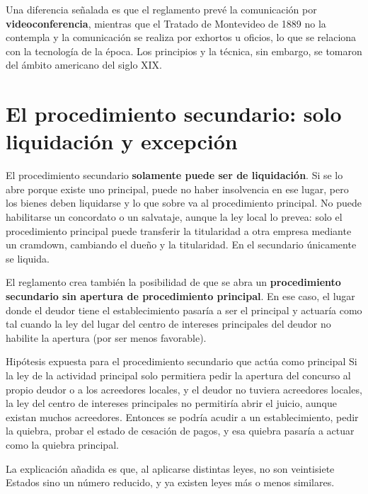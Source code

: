 \documentclass[12pt,oneside]{book}
\begin{document}
Una diferencia señalada es que el reglamento prevé la comunicación por \textbf{videoconferencia}, mientras que el Tratado de Montevideo de 1889 no la contempla y la comunicación se realiza por exhortos u oficios, lo que se relaciona con la tecnología de la época. Los principios y la técnica, sin embargo, se tomaron del ámbito americano del siglo XIX.

\section{El procedimiento secundario: solo liquidación y excepción}

El procedimiento secundario \textbf{solamente puede ser de liquidación}. Si se lo abre porque existe uno principal, puede no haber insolvencia en ese lugar, pero los bienes deben liquidarse y lo que sobre va al procedimiento principal. No puede habilitarse un concordato o un salvataje, aunque la ley local lo prevea: solo el procedimiento principal puede transferir la titularidad a otra empresa mediante un cramdown, cambiando el dueño y la titularidad. En el secundario únicamente se liquida.

El reglamento crea también la posibilidad de que se abra un \textbf{procedimiento secundario sin apertura de procedimiento principal}. En ese caso, el lugar donde el deudor tiene el establecimiento pasaría a ser el principal y actuaría como tal cuando la ley del lugar del centro de intereses principales del deudor no habilite la apertura (por ser menos favorable).

\begin{example}{Hipótesis expuesta para el procedimiento secundario que actúa como principal}
Si la ley de la actividad principal solo permitiera pedir la apertura del concurso al propio deudor o a los acreedores locales, y el deudor no tuviera acreedores locales, la ley del centro de intereses principales no permitiría abrir el juicio, aunque existan muchos acreedores. Entonces se podría acudir a un establecimiento, pedir la quiebra, probar el estado de cesación de pagos, y esa quiebra pasaría a actuar como la quiebra principal.
\end{example}

La explicación añadida es que, al aplicarse distintas leyes, no son veintisiete Estados sino un número reducido, y ya existen leyes más o menos similares.
\end{document}

